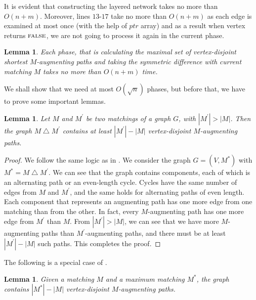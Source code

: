 \documentclass[12pt]{report}
\newtheorem{llemma}[base]{Lemma}
\numberwithin{algorithm}{chapter}
\newcommand{\False}{\textsc{false}}
\begin{document}
	It is evident that constructing the layered network takes no more than $O(n + m)$. Moreover, lines $13$-$17$ take no more than $O(n + m)$ as each edge is examined at most once (with the help of $\mathit{ptr}$ array) and as a result when vertex returns $\False$, we are not going to process it again  in the current phase.

	\begin{llemma} \label{phaseHKComplexity}
		Each phase, that is calculating the maximal set of vertex-disjoint shortest $M$-augmenting paths and taking the symmetric difference with current matching $M$ takes no more than $O(n + m)$ time.
	\end{llemma}
	
	We shall show that we need at most $O(\sqrt{n})$ phases, but before that, we have to prove some important lemmas.
	\begin{llemma}\label{generalAPlemma}
			Let $M$ and $M^{'}$ be two matchings of a graph $G$, with $|M^{'}|>|M|$. Then the graph
			$M \bigtriangleup M^{'}$ contains at least $|M^{'}|-|M|$ vertex-disjoint $M$-augmenting paths.
	\end{llemma}
	\begin{proof}
		We follow the same logic as in . We consider the graph $G = (V, M^{*})$ with $M^{*} = M \bigtriangleup M^{'}$. We can see that the graph contains components, each of which is an alternating path or an even-length cycle. Cycles have the same number of edges from $M$ and $M^{'}$, and the same holds for alternating paths of even length. Each component that represents an augmenting path has one more edge from one matching than from the other. In fact, every $M$-augmenting path has one more edge from $M^{'}$ than $M$. From $|M^{'}| > |M|$, we can see that we have more $M$-augmenting paths than $M^{'}$-augmenting paths, and there must be at least $|M^{'}| - |M|$ such paths. This completes the proof.
	\end{proof}

	The following is a special case of .
	
	\begin{llemma} \label{specialCaseAPLemma}
		Given a matching $M$ and a maximum matching $M^{*}$, the graph contains $|M^{*}| - |M|$ vertex-disjoint $M$-augmenting paths.
	\end{llemma}
\end{document}
